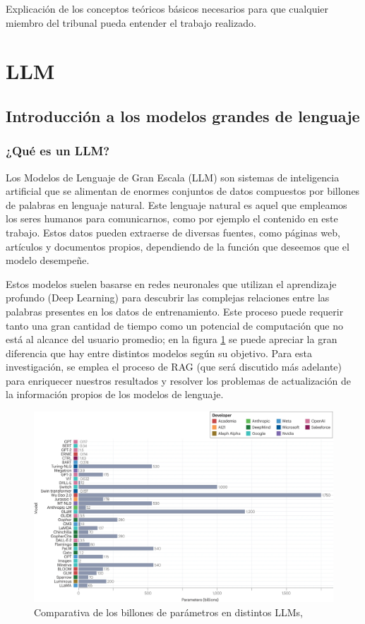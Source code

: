 

Explicación de los conceptos teóricos básicos necesarios para que cualquier miembro del tribunal pueda entender el trabajo realizado.


\section{LLM}
\subsection{Introducción a los modelos grandes de lenguaje}
\subsubsection{¿Qué es un LLM?}

Los Modelos de Lenguaje de Gran Escala (LLM) son sistemas de inteligencia artificial que se alimentan de enormes conjuntos de datos compuestos por billones de palabras en lenguaje natural. Este lenguaje natural es aquel que empleamos los seres humanos para comunicarnos, como por ejemplo el contenido en este trabajo. Estos datos pueden extraerse de diversas fuentes, como páginas web, artículos y documentos propios, dependiendo de la función que deseemos que el modelo desempeñe.

Estos modelos suelen basarse en redes neuronales que utilizan el aprendizaje profundo (Deep Learning) para descubrir las complejas relaciones entre las palabras presentes en los datos de entrenamiento. Este proceso puede requerir tanto una gran cantidad de tiempo como un potencial de computación que no está al alcance del usuario promedio; en la figura \ref{fig:graficallms} se puede apreciar la gran diferencia que hay entre distintos modelos según su objetivo. Para esta investigación, se emplea el proceso de RAG (que será discutido más adelante) para enriquecer nuestros resultados y resolver los problemas de actualización de la información propios de los modelos de lenguaje.

\begin{figure}[h]
    \centering
    \includegraphics[width=1\textwidth]{img/recentllms.jpg}
    \caption{Comparativa de los billones de parámetros en distintos LLMs, \cite{thirunavukarasu_large_2023}}
    \label{fig:graficallms}
\end{figure}


